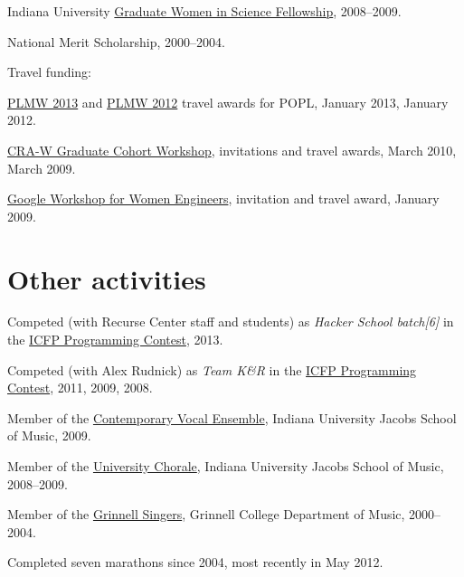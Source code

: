 \documentclass[10pt,letterpaper]{article}
\newenvironment{itemize*}
  {\begin{itemize}
      \setlength{\itemsep}{1pt}
      \setlength{\parskip}{3pt}
  }
  {\end{itemize}}
\begin{document}
\begin{itemize*}

\item
  Indiana University
  \href{http://www.indiana.edu/~grdschl/graduate-women-in-science.php}{Graduate
    Women in Science Fellowship}, 2008--2009.

\item National Merit Scholarship, 2000--2004.

\item Travel funding:
  \begin{itemize*}
  \item
    \href{http://www.doc.ic.ac.uk/~gds/PLMW/}{PLMW 2013} and
    \href{http://www.cis.upenn.edu/~sweirich/plmw12/}{PLMW 2012}
    travel awards for POPL, January 2013, January 2012.

  \item \href{http://cra-w.org/gradcohort}{CRA-W Graduate Cohort
    Workshop}, invitations and travel awards, March 2010, March 2009.

  \item
    \href{http://googleforstudents.blogspot.com/2008/12/google-workshop-for-women-engineers.html}{Google
      Workshop for Women Engineers}, invitation and travel award,
    January 2009.
  \end{itemize*}

\end{itemize*}

\section*{Other activities}

\begin{itemize*}

\item Competed (with Recurse Center staff and students) as {\em Hacker
  School batch[6]} in the \href{http://www.icfpcontest.org}{ICFP
  Programming Contest}, 2013.

\item Competed (with Alex Rudnick) as {\em Team K\&R} in the
  \href{http://www.icfpcontest.org}{ICFP Programming Contest}, 2011,
  2009, 2008.

\item Member of the
  \href{http://www.music.indiana.edu/departments/ensembles/cve.shtml}{Contemporary
    Vocal Ensemble}, Indiana University Jacobs School of Music, 2009.

\item Member of the
  \href{http://www.music.indiana.edu/departments/ensembles/university-chorale.shtml}{University
    Chorale}, Indiana University Jacobs School of Music, 2008--2009.

\item Member of the
  \href{http://www.grinnell.edu/academic/music/ensembles/singers}{Grinnell
    Singers}, Grinnell College Department of Music, 2000--2004.

\item Completed seven marathons since 2004, most recently in May 2012.

\end{itemize*}
\end{document}
